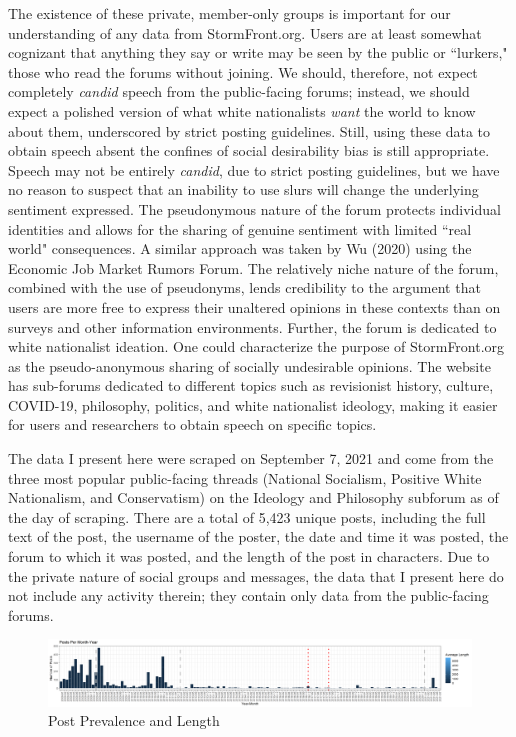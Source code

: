 \documentclass[12pt]{paper}
\begin{document}
The existence of these private, member-only groups is important for our understanding of any data from StormFront.org. Users are at least somewhat cognizant that anything they say or write may be seen by the public or ``lurkers," those who read the forums without joining. We should, therefore, not expect completely \textit{candid} speech from the public-facing forums; instead, we should expect a polished version of what white nationalists \textit{want} the world to know about them, underscored by strict posting guidelines. Still, using these data to obtain speech absent the confines of social desirability bias is still appropriate. Speech may not be entirely \textit{candid}, due to strict posting guidelines, but we have no reason to suspect that an inability to use slurs will change the underlying sentiment expressed. The pseudonymous nature of the forum protects individual identities and allows for the sharing of genuine sentiment with limited ``real world" consequences. A similar approach was taken by Wu (2020) using the Economic Job Market Rumors Forum. The relatively niche nature of the forum, combined with the use of pseudonyms, lends credibility to the argument that users are more free to express their unaltered opinions in these contexts than on surveys and other information environments. Further, the forum is dedicated to white nationalist ideation. One could characterize the purpose of StormFront.org as the pseudo-anonymous sharing of socially undesirable opinions. The website has sub-forums dedicated to different topics such as revisionist history, culture, COVID-19, philosophy, politics, and white nationalist ideology, making it easier for users and researchers to obtain speech on specific topics.

The data I present here were scraped on September 7, 2021 and come from the three most popular public-facing threads (National Socialism, Positive White Nationalism, and Conservatism) on the Ideology and Philosophy subforum as of the day of scraping. There are a total of 5,423 unique posts, including the full text of the post, the username of the poster, the date and time it was posted, the forum to which it was posted, and the length of the post in characters.  Due to the private nature of social groups and messages, the data that I present here do not include any activity therein; they contain only data from the public-facing forums. 

\begin{figure} \centering
	\includegraphics[width=.8\linewidth]{figs/ip_frequency_length.png}
	\caption{Post Prevalence and Length}
	\label{}
\end{figure}
\end{document}
